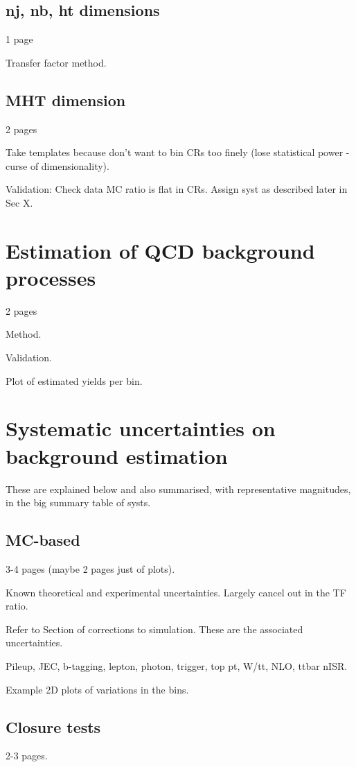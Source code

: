 \subsection{nj, nb, ht dimensions}
1 page

Transfer factor method.

\subsection{MHT dimension}
2 pages

Take templates because don't want to bin CRs too finely (lose statistical power 
- curse of dimensionality).

Validation: Check data MC ratio is flat in CRs. Assign syst as described later 
in Sec X.

\section{Estimation of QCD background processes}
2 pages

Method.

Validation.

Plot of estimated yields per bin.

\section{Systematic uncertainties on background estimation}

These are explained below and also summarised, with representative magnitudes, 
in the big summary table of systs.

\subsection{MC-based}
3-4 pages (maybe 2 pages just of plots).

Known theoretical and experimental uncertainties.
Largely cancel out in the TF ratio.

Refer to Section of corrections to simulation. These are the associated 
uncertainties.

Pileup, JEC, b-tagging, lepton, photon, trigger, top pt, W/tt, NLO, ttbar nISR.

Example 2D plots of variations in the bins.

\subsection{Closure tests}
2-3 pages.

